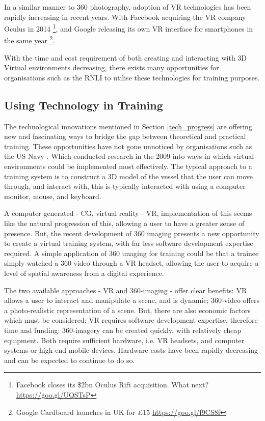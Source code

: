 \documentclass[ %
                    author={Elis Jones},
                supervisor={Dr. Kirsten Cater},
                    degree={BSc},
                     title={The Effect of Presentation Medium on Spatial Cognition},
                  subtitle={in the Virtual Environment},
                      year={2018} ]{dissertation}
\begin{document}
In a similar manner to 360 photography, adoption of VR technologies has been rapidly increasing in recent years. With Facebook acquiring the VR company Oculus in 2014 \footnote{Facebook closes its \$2bn Oculus Rift acquisition. What next? \url{https://goo.gl/UQSTsP}}, and Google releasing its own VR interface for smartphones in the same year \footnote{Google Cardboard launches in UK for £15 \url{https://goo.gl/f9CS8f}}.  

With the time and cost requirement of both creating and interacting with 3D Virtual environments decreasing, there exists many opportunities for organisations such as the RNLI to utilise these technologies for training purposes. 

\subsection{Using Technology in Training }
The technological innovations mentioned in Section \ref{tech_progress} are offering new and fascinating ways to bridge the gap between theoretical and practical training.  These opportunities have not gone unnoticed by organisations such as the US Navy \citep{hussein}. Which conducted research in the 2009 into ways in which virtual environments could be implemented most effectively. The typical approach to a training system is to construct a 3D model of the vessel that the user can move through, and interact with, this is typically interacted with using a computer monitor, mouse, and keyboard. 

A computer generated - CG, virtual reality - VR, implementation of this seems like the natural progression of this, allowing a user to have a greater sense of presence. But, the recent development of 360 imaging presents a new opportunity to create a virtual training system, with far less software development expertise required. A simple application of 360 imaging for training could be that a trainee simply watched a 360 video through a VR headset, allowing the user to acquire a level of spatial awareness from a digital experience.

The two available approaches - VR and 360-imaging - offer clear benefits: VR allows a user to interact and manipulate a scene, and is dynamic; 360-video offers a photo-realistic representation of a scene. But, there are also economic factors which must be considered: VR requires software development expertise, therefore time and funding; 360-imagery can be created quickly, with relatively cheap equipment. Both require sufficient hardware, i.e. VR headsets, and computer systems or high-end mobile devices.  Hardware costs have been rapidly decreasing and can be expected to continue to do so. 
\end{document}
